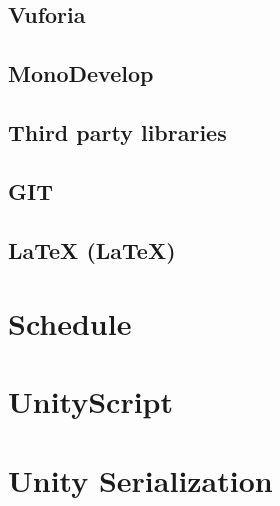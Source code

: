 \documentclass[BSP,english,oneside]{classes/gucthesis}
\begin{document}
		\subsection{Vuforia}
			\label{subsec:vuforia}
			

		\subsection{MonoDevelop}
			\label{subsec:monodevelop}
			

		\subsection{Third party libraries}
			\label{subsec:third_party_libraries}
			
			
		\subsection{GIT}
			\label{subsec:git}
			

		\subsection{LaTeX (\LaTeX{})}
			\label{subsec:latex}
			


	\section{Schedule}
		\label{sec:schedule}
		

%		
	\clearpage
	\section{UnityScript}
		\label{sec:UnityScript}
		

	\section{Unity Serialization}
		\label{sec:UnitySerialization}
		
\end{document}
